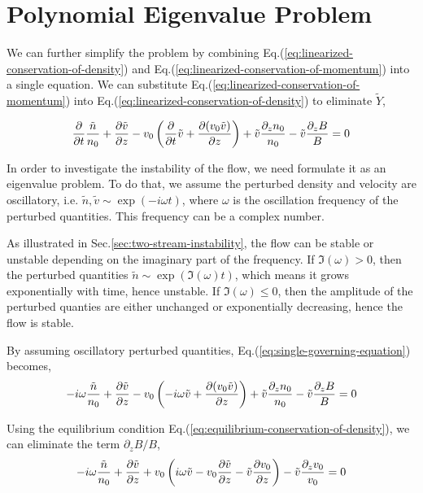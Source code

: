 \section{Polynomial Eigenvalue Problem}
We can further simplify the problem by combining Eq.(\ref{eq:linearized-conservation-of-density}) and Eq.(\ref{eq:linearized-conservation-of-momentum}) into a single equation. We can substitute Eq.(\ref{eq:linearized-conservation-of-momentum}) into Eq.(\ref{eq:linearized-conservation-of-density}) to eliminate $\tilde{Y}$,

\begin{equation} \label{eq:single-governing-equation}
	\pdv{t}\frac{\tilde{n}}{n_0}
	+ \pdv{\tilde{v}}{z} - v_0\left(\pdv{t}\tilde{v}
	+ \pdv{(v_0\tilde{v})}{z}\right)
	+ \tilde{v}\frac{\partial_z n_0}{n_0}
	- \tilde{v}\frac{\partial_z B}{B}
	= 0
\end{equation}

In order to investigate the instability of the flow, we need formulate it as an eigenvalue problem. To do that, we assume the perturbed density and velocity are oscillatory, i.e. $\tilde{n}, \tilde{v} \sim \exp(-i\omega t)$, where $\omega$ is the oscillation frequency of the perturbed quantities. This frequency can be a complex number.

As illustrated in Sec.\ref{sec:two-stream-instability}, the flow can be stable or unstable depending on the imaginary part of the frequency. If $\Im(\omega) > 0$, then the perturbed quantities $\tilde{n} \sim \exp(\Im(\omega) t)$, which means it grows exponentially with time, hence unstable. If $\Im(\omega) \leq 0$, then the amplitude of the perturbed quanties are either unchanged or exponentially decreasing, hence the flow is stable.

By assuming oscillatory perturbed quantities, Eq.(\ref{eq:single-governing-equation}) becomes,
\begin{equation}
	-i\omega\frac{\tilde{n}}{n_0}
	+ \pdv{\tilde{v}}{z} - v_0\left(-i\omega\tilde{v}
	+ \pdv{(v_0\tilde{v})}{z}\right)
	+ \tilde{v}\frac{\partial_z n_0}{n_0}
	- \tilde{v}\frac{\partial_z B}{B}
	= 0
\end{equation}

Using the equilibrium condition Eq.(\ref{eq:equilibrium-conservation-of-density}), we can eliminate the term $\partial_z B/B$,
\[
	-i\omega\frac{\tilde{n}}{n_0}
	+ \pdv{\tilde{v}}{z}
	+ v_0\left(i\omega \tilde{v} - v_0\pdv{\tilde{v}}{z} - \tilde{v}\pdv{v_0}{z} \right)
	- \tilde{v}\frac{\partial_z v_0}{v_0}
	= 0
\]

